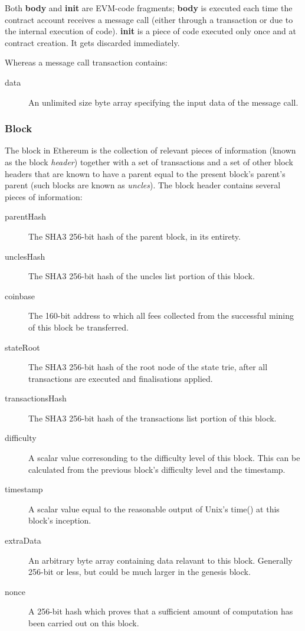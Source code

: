 \documentclass[9pt,oneside]{amsart}
\begin{document}
\begin{multicols}{2}
Both \textbf{body} and \textbf{init} are EVM-code fragments; \textbf{body} is executed each time the contract account receives a message call (either through a transaction or due to the internal execution of code). \textbf{init} is a piece of code executed only once and at contract creation. It gets discarded immediately.

Whereas a message call transaction contains:

\begin{description}
\item[data] An unlimited size byte array specifying the input data of the message call.
\end{description}


\subsubsection{Block} \label{ch:block}

The block in Ethereum is the collection of relevant pieces of information (known as the block \textit{header}) together with a set of transactions and a set of other block headers that are known to have a parent equal to the present block's parent's parent (such blocks are known as \textit{uncles}). The block header contains several pieces of information:

\begin{description}
\item[parentHash] The SHA3 256-bit hash of the parent block, in its entirety.
\item[unclesHash] The SHA3 256-bit hash of the uncles list portion of this block.
\item[coinbase] The 160-bit address to which all fees collected from the successful mining of this block be transferred.
\item[stateRoot] The SHA3 256-bit hash of the root node of the state trie, after all transactions are executed and finalisations applied.
\item[transactionsHash] The SHA3 256-bit hash of the transactions list portion of this block.
\item[difficulty] A scalar value corresonding to the difficulty level of this block. This can be calculated from the previous block's difficulty level and the timestamp.
\item[timestamp] A scalar value equal to the reasonable output of Unix's time() at this block's inception.
\item[extraData] An arbitrary byte array containing data relavant to this block. Generally 256-bit or less, but could be much larger in the genesis block.
\item[nonce] A 256-bit hash which proves that a sufficient amount of computation has been carried out on this block.
\end{description}


\end{multicols}
\end{document}
